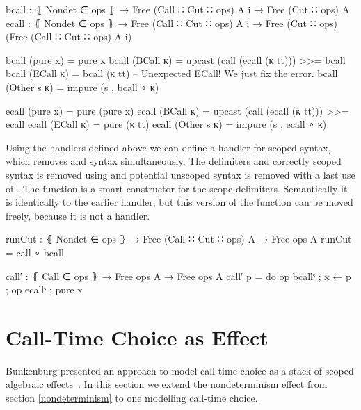 \begin{code}
bcall  : ⦃ Nondet ∈ ops ⦄ → Free (Call ∷ Cut ∷ ops) A {i} → Free (Cut ∷ ops) A
ecall  : ⦃ Nondet ∈ ops ⦄ → Free (Call ∷ Cut ∷ ops) A {i}
  → Free (Cut ∷ ops) (Free (Call ∷ Cut ∷ ops) A {i})

bcall (pure x)     = pure x
bcall (BCall κ)    = upcast (call (ecall (κ tt))) >>= bcall
bcall (ECall κ)    = bcall (κ tt) -- Unexpected ECall! We just fix the error.
bcall (Other s κ)  = impure (s , bcall ∘ κ)

ecall (pure x)     = pure (pure x)
ecall (BCall κ)    = upcast (call (ecall (κ tt))) >>= ecall
ecall (ECall κ)    = pure (κ tt)
ecall (Other s κ)  = impure (s , ecall ∘ κ)
\end{code}
Using the handlers defined above we can define a handler for scoped
 syntax, which removes  and
 syntax simultaneously.
The delimiters and correctly scoped  syntax is removed using
 and potential unscoped  syntax is
removed with a last use of .
The function  is a smart constructor for the scope
delimiters.
Semantically it is identically to the earlier  handler, but
this version of the function can be moved freely, because it is not a handler.

\begin{code}
runCut : ⦃ Nondet ∈ ops ⦄ → Free (Call ∷ Cut ∷ ops) A → Free ops A
runCut = call ∘ bcall

call′ : ⦃ Call ∈ ops ⦄ → Free ops A → Free ops A
call′ p = do op bcallˢ ; x ← p ; op ecallˢ ; pure x
\end{code}

\section{Call-Time Choice as Effect}

Bunkenburg presented an approach to model call-time choice as a stack of
scoped algebraic effects~\cite{bunkenburg2019modeling}.
In this section we extend the nondeterminism effect from section
\ref{nondeterminism} to one modelling call-time choice.

